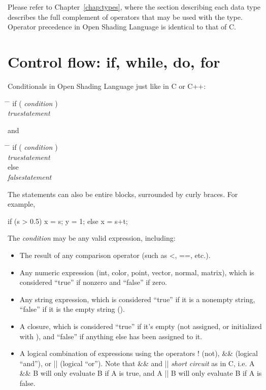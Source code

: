 \documentclass[11pt,letterpaper]{book}
\def\langname{Open Shading Language\xspace}
\def\color{{\cf color}\xspace}
\def\inttype{{\cf int}\xspace}
\def\matrix{{\cf matrix}\xspace}
\def\normal{{\cf normal}\xspace}
\def\point{{\cf point}\xspace}
\def\vector{{\cf vector}\xspace}
\def\closure{{\cf closure}\xspace}
\begin{document}
Please refer to Chapter~\ref{chap:types}, where the section describing
each data type describes the full complement of operators that may be
used with the type.  Operator precedence in \langname is identical to
that of C.


\section{Control flow: {\cf if, while, do, for}}
\label{sec:controlflow}

Conditionals in \langname just like in C or C++:

\begin{tabbing}
\hspace{0.5in} \= \hspace{0.3in} \= \kill
\> {\cf if (} \emph{condition} {\cf )} \\
\> \> \emph{truestatement}  
\end{tabbing}

\noindent and

\begin{tabbing}
\hspace{0.5in} \= \hspace{0.3in} \= \kill
\> {\cf if (} \emph{condition} {\cf )} \\
\> \> \emph{truestatement}  \\
\> {\cf else} \\
\> \> \emph{falsestatement}  
\end{tabbing}

\noindent The statements can also be entire blocks, surrounded by curly
braces.  For example,

\begin{code}
       if (s > 0.5) {
           x = s;
           y = 1;
       } else {
           x = s+t;
       }
\end{code}

\noindent The \emph{condition} may be any valid expression, including:

\begin{itemize}
\item The result of any comparison operator (such as {\cf <}, {\cf ==},
  etc.).
\item Any numeric expression (\inttype, \color, \point, \vector,
  \normal, \matrix), which is considered ``true'' if nonzero and
  ``false'' if zero.
\item Any string expression, which is considered ``true'' if it is a
  nonempty string, ``false'' if it is the empty string (\qkw{}).
\item A \closure, which is considered ``true'' if it's empty (not
  assigned, or initialized with {}), and ``false'' if anything
  else has been assigned to it.
\item A logical combination of expressions using the operators {\cf !}
  (not), {\cf \&\&} (logical ``and''), or {\cf ||} (logical ``or'').
  Note that {\cf \&\&} and {\cf ||} \emph{short circuit} as in C,
  i.e. {\cf A \&\& B} will only evaluate B if A is true, and {\cf A ||
    B} will only evaluate B if A is false.
\end{itemize}
\end{document}

